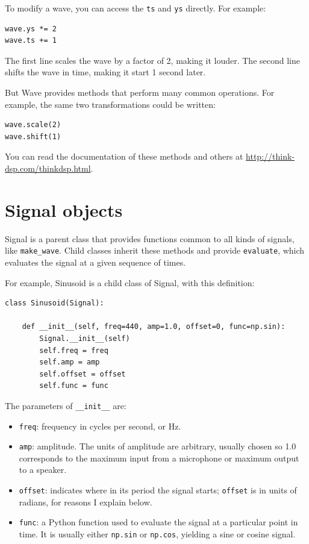 \documentclass[12pt]{book}
\begin{document}
To modify a wave, you can access the {\tt ts} and {\tt ys} directly.
For example:

\begin{verbatim}
wave.ys *= 2
wave.ts += 1
\end{verbatim} 

The first line scales the wave by a factor of 2, making
it louder.  The second line shifts the wave in time, making it
start 1 second later.

But Wave provides methods that perform many common operations.
For example, the same two transformations could be written:

\begin{verbatim}
wave.scale(2)
wave.shift(1)
\end{verbatim} 

You can read the documentation of these methods and others at
\url{http://think-dsp.com/thinkdsp.html}.


\section{Signal objects}
\label{sigobs}

Signal is a parent class that provides functions common to all
kinds of signals, like \verb"make_wave".  Child classes inherit
these methods and provide {\tt evaluate}, which evaluates the
signal at a given sequence of times.

For example, Sinusoid is a child class of Signal, with this
definition:

\begin{verbatim}
class Sinusoid(Signal):
    
    def __init__(self, freq=440, amp=1.0, offset=0, func=np.sin):
        Signal.__init__(self)
        self.freq = freq
        self.amp = amp
        self.offset = offset
        self.func = func
\end{verbatim}

The parameters of \verb"__init__" are:

\begin{itemize}

\item {\tt freq}: frequency in cycles per second, or Hz.

\item {\tt amp}: amplitude.  The units of amplitude are arbitrary,
usually chosen so 1.0 corresponds to the maximum input from a
microphone or maximum output to a speaker.

\item {\tt offset}: indicates where in its period the signal starts;
{\tt offset} is in units of radians, for reasons I explain below.

\item {\tt func}: a Python function used
to evaluate the signal at a particular point in time.  It is
usually either {\tt np.sin} or {\tt np.cos}, yielding a sine or
cosine signal.

\end{itemize}
\end{document}
